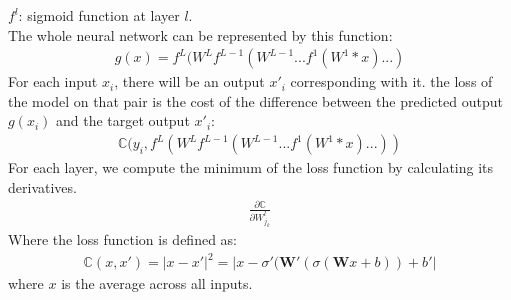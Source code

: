 \documentclass[paper=a4, fontsize=12pt]{scrartcl}
\begin{document}
$f^l$: sigmoid function at layer $l$.\\
The whole neural network can be represented by this function:\\
\begin{align*}
g(x) = f^{L}(W^Lf^{L-1}(W^{L-1}...f^1(W^1*x)...)
\end{align*}
For each input $x_i$, there will be an output $x'_i$ corresponding with it. the loss of the model on that pair is the cost of the difference between the predicted output $g(x_i)$  and the target output $x'_i$:\\
\begin{align*}
\mathbb{C}(y_i, f^{L}(W^Lf^{L-1}(W^{L-1}...f^1(W^1*x)...))
\end{align*}
For each layer, we compute the minimum of the loss function by calculating its derivatives. 
\begin{align*}
\frac{\partial \mathbb{C}}{\partial W^l_{j_k}}
\end{align*}
Where the loss function is defined as: 
\begin{align*}
\mathbb{C}(x, x') = \lvert x - x'\rvert^2 = \lvert x - \sigma'(\mathbf{W}'(\sigma (\mathbf{W}x + b)) + b' \rvert
\end{align*}
where $x$ is the average across all inputs.
\end{document}
